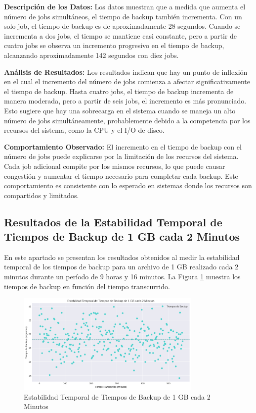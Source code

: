 \textbf{Descripción de los Datos:}
Los datos muestran que a medida que aumenta el número de jobs simultáneos, el tiempo de backup también incrementa. Con un solo job, el tiempo de backup es de aproximadamente 28 segundos. Cuando se incrementa a dos jobs, el tiempo se mantiene casi constante, pero a partir de cuatro jobs se observa un incremento progresivo en el tiempo de backup, alcanzando aproximadamente 142 segundos con diez jobs.

\textbf{Análisis de Resultados:}
Los resultados indican que hay un punto de inflexión en el cual el incremento del número de jobs comienza a afectar significativamente el tiempo de backup. Hasta cuatro jobs, el tiempo de backup incrementa de manera moderada, pero a partir de seis jobs, el incremento es más pronunciado. Esto sugiere que hay una sobrecarga en el sistema cuando se maneja un alto número de jobs simultáneamente, probablemente debido a la competencia por los recursos del sistema, como la CPU y el I/O de disco.

\textbf{Comportamiento Observado:}
El incremento en el tiempo de backup con el número de jobs puede explicarse por la limitación de los recursos del sistema. Cada job adicional compite por los mismos recursos, lo que puede causar congestión y aumentar el tiempo necesario para completar cada backup. Este comportamiento es consistente con lo esperado en sistemas donde los recursos son compartidos y limitados.






\subsection{Resultados de la Estabilidad Temporal de Tiempos de Backup de 1 GB cada 2 Minutos}

En este apartado se presentan los resultados obtenidos al medir la estabilidad temporal de los tiempos de backup para un archivo de 1 GB realizado cada 2 minutos durante un período de 9 horas y 16 minutos. La Figura \ref{fig:estabilidad-temporal} muestra los tiempos de backup en función del tiempo transcurrido.

\begin{figure}[H]
    \centering
    \includegraphics[width=0.8\textwidth]{estabilidad_temporal.png}
    \caption{Estabilidad Temporal de Tiempos de Backup de 1 GB cada 2 Minutos}
    \label{fig:estabilidad-temporal}
\end{figure}

